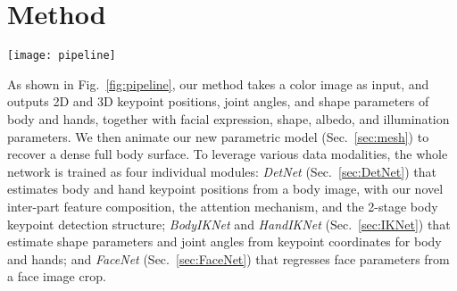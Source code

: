 \documentclass[final]{cvpr}
\begin{document}
 \section{Method}
\begin{figure*}[ht!]
  \centering
  \texttt{[image: pipeline]}
  \caption{
System overview and DetNet structure.
Left: An input image $I_h$ is first downscaled by 4x for body keypoint detection and face/hand localization.
The hand area is then cropped from $I_h$ to retrieve \textit{supp-features}, which are concatenated with processed \textit{body-features} for hand keypoint detection.
Here, we use the attention channel to indicate the validity of \textit{body-features}.
Body and hand 3D keypoint positions are fed into \textit{BodyIKNet} and \textit{HandIKNet} to estimate joint angles.
The face area is cropped from $I_h$ and processed by \textit{FaceNet}.
Finally, the parameters are combined to obtain a full mesh.
Right: The detailed structure of \textit{DetNet}.
Descriptions can be found in Sec.~\ref{sec:DetNet}.
We only illustrate one hand for simplicity.
}
  \label{fig:pipeline}
\end{figure*}
As shown in Fig.~\ref{fig:pipeline}, our method takes a color image as input, and outputs 2D and 3D keypoint positions, joint angles, and shape parameters of body and hands, together with facial expression, shape, albedo, and illumination parameters.
We then animate our new parametric model (Sec.~\ref{sec:mesh}) to recover a dense full body surface.
To leverage various data modalities, the whole network is trained as four individual modules:
\textit{DetNet} (Sec.~\ref{sec:DetNet}) that estimates body and hand keypoint positions from a body image, with our novel inter-part feature composition, the attention mechanism, and the 2-stage body keypoint detection structure;
\textit{BodyIKNet} and \textit{HandIKNet} (Sec.~\ref{sec:IKNet}) that estimate shape parameters and joint angles from keypoint coordinates for body and hands;
and \textit{FaceNet} (Sec.~\ref{sec:FaceNet}) that regresses face parameters from a face image crop.
\end{document}
